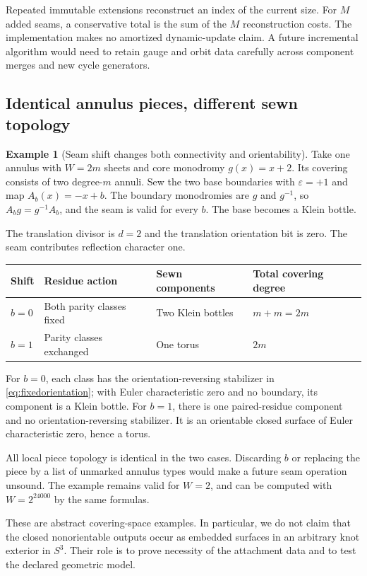 \documentclass[11pt,a4paper]{article}
\theoremstyle{definition}\newtheorem{definition}[theorem]{Definition}
\newtheorem{example}[theorem]{Example}
\theoremstyle{remark}\newtheorem{remark}[theorem]{Remark}
\begin{document}
Repeated immutable extensions reconstruct an index of the current size.
For $M$ added seams, a conservative total is the sum of the $M$ reconstruction
costs. The implementation makes no amortized dynamic-update claim. A
future incremental algorithm would need to retain gauge and orbit data
carefully across component merges and new cycle generators.

\subsection{Identical annulus pieces, different sewn topology}

\begin{example}[Seam shift changes both connectivity and orientability]
\label{ex:klein}
Take one annulus with $W=2m$ sheets and core monodromy $g(x)=x+2$. Its
covering consists of two degree-$m$ annuli. Sew the two base boundaries with
$\varepsilon=+1$ and map $A_b(x)=-x+b$. The boundary monodromies are
$g$ and $g^{-1}$, so $A_bg=g^{-1}A_b$, and the seam is valid for every $b$.
The base becomes a Klein bottle.
\end{example}

The translation divisor is $d=2$ and the translation orientation bit is
zero. The seam contributes reflection character one.
\begin{center}
\begin{tabular}{llll}
\toprule
Shift & Residue action & Sewn components & Total covering degree\\
\midrule
$b=0$ & Both parity classes fixed & Two Klein bottles & $m+m=2m$\\
$b=1$ & Parity classes exchanged & One torus & $2m$\\
\bottomrule
\end{tabular}
\end{center}
For $b=0$, each class has the orientation-reversing stabilizer in
\eqref{eq:fixedorientation}; with Euler characteristic zero and no boundary,
its component is a Klein bottle. For $b=1$, there is one paired-residue
component and no orientation-reversing stabilizer. It is an orientable
closed surface of Euler characteristic zero, hence a torus.

All local piece topology is identical in the two cases. Discarding $b$ or
replacing the piece by a list of unmarked annulus types would make a future
seam operation unsound. The example remains valid for $W=2$, and can be
computed with $W=2^{24000}$ by the same formulas.

These are abstract covering-space examples. In particular, we do not claim
that the closed nonorientable outputs occur as embedded surfaces in an
arbitrary knot exterior in $S^3$. Their role is to prove necessity of the
attachment data and to test the declared geometric model.
\end{document}
